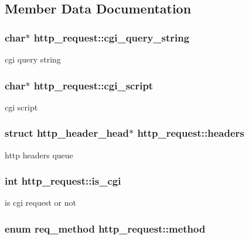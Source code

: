 \subsection{Member Data Documentation}
\hypertarget{structhttp__request_a7921955f2c90460106baa8989aba0444}{
\subsubsection[{cgi\_\-query\_\-string}]{\setlength{\rightskip}{0pt plus 5cm}char$\ast$ {\bf http\_\-request::cgi\_\-query\_\-string}}}
\label{structhttp__request_a7921955f2c90460106baa8989aba0444}
cgi query string \hypertarget{structhttp__request_a1bdae16cb3c4e415fbdc0f1038f0d4ca}{
\subsubsection[{cgi\_\-script}]{\setlength{\rightskip}{0pt plus 5cm}char$\ast$ {\bf http\_\-request::cgi\_\-script}}}
\label{structhttp__request_a1bdae16cb3c4e415fbdc0f1038f0d4ca}
cgi script \hypertarget{structhttp__request_a93e4704948ed590362fe6c109a548174}{
\subsubsection[{headers}]{\setlength{\rightskip}{0pt plus 5cm}struct http\_\-header\_\-head$\ast$ {\bf http\_\-request::headers}}}
\label{structhttp__request_a93e4704948ed590362fe6c109a548174}
http headers queue \hypertarget{structhttp__request_a539af9f5712d370caf999c9507cf4302}{
\subsubsection[{is\_\-cgi}]{\setlength{\rightskip}{0pt plus 5cm}int {\bf http\_\-request::is\_\-cgi}}}
\label{structhttp__request_a539af9f5712d370caf999c9507cf4302}
is cgi request or not \hypertarget{structhttp__request_a9c335e7e58b388eebbc47566bac7ccf8}{
\subsubsection[{method}]{\setlength{\rightskip}{0pt plus 5cm}enum req\_\-method {\bf http\_\-request::method}}}
